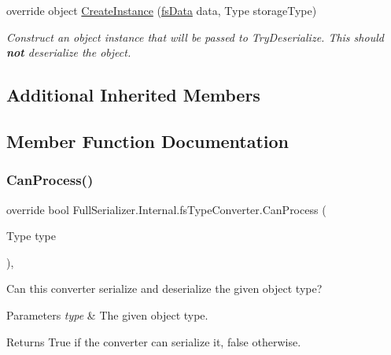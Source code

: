 \begin{DoxyCompactItemize}
override object \hyperlink{class_full_serializer_1_1_internal_1_1fs_type_converter_af2049f4529f9138347b63bee54aa7397}{Create\+Instance} (\hyperlink{class_full_serializer_1_1fs_data}{fs\+Data} data, Type storage\+Type)
\begin{DoxyCompactList}\small\item\em Construct an object instance that will be passed to Try\+Deserialize. This should {\bfseries not} deserialize the object. \end{DoxyCompactList}\end{DoxyCompactItemize}
\subsection*{Additional Inherited Members}


\subsection{Member Function Documentation}
\mbox{\label{class_full_serializer_1_1_internal_1_1fs_type_converter_afbf95621a91efff18569544dee5134fe}} 
\subsubsection{\texorpdfstring{Can\+Process()}{CanProcess()}}
{\footnotesize\ttfamily override bool Full\+Serializer.\+Internal.\+fs\+Type\+Converter.\+Can\+Process (\begin{DoxyParamCaption}\item[{Type}]{type }\end{DoxyParamCaption})\hspace{0.3cm}{\ttfamily [inline]}, {\ttfamily [virtual]}}



Can this converter serialize and deserialize the given object type? 


\begin{DoxyParams}{Parameters}
{\em type} & The given object type.\\
\hline
\end{DoxyParams}
\begin{DoxyReturn}{Returns}
True if the converter can serialize it, false otherwise.
\end{DoxyReturn}


